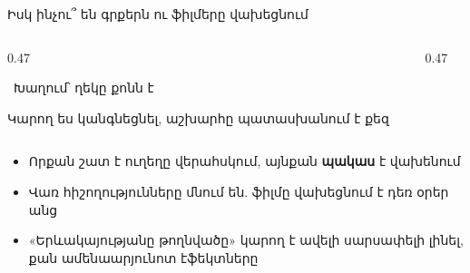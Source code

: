 \begin{frame}{Իսկ ինչու՞ են գրքերն ու ֆիլմերը վախեցնում}
  \begin{columns}[T]
    \begin{column}{0.47\textwidth}
      \begin{card}[colback=mint!35!cardwhite]
        \ {\blackfont Խաղում՝ ղեկը քոնն է}\par
        Կարող ես կանգնեցնել, աշխարհը պատասխանում է քեզ
      \end{card}
    \end{column}
    \begin{column}{0.47\textwidth}
    \end{column}
  \end{columns}
  \vspace{2mm}
  \begin{itemize}
    \item<3-> Որքան շատ է ուղեղը վերահսկում, այնքան \textbf{պակաս} է վախենում
    \item<4-> Վառ հիշողությունները մնում են. ֆիլմը վախեցնում է դեռ օրեր անց
    \item<5-> «Երևակայությանը թողնվածը» կարող է ավելի սարսափելի լինել, քան ամենաարյունոտ էֆեկտները
  \end{itemize}
\end{frame}

